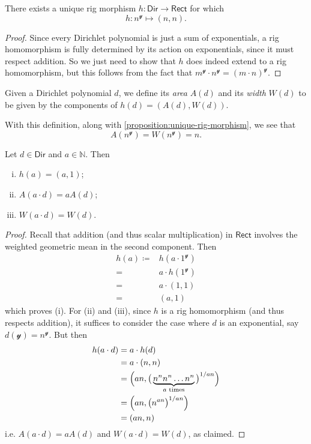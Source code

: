 \documentclass[11pt,fleqn]{article}
\newcommand{\yon}{\mathcal{y}}
\newcommand{\rig}[1]{\mathsf{#1}}
\newcommand{\Dir}{\rig{Dir}}
\newcommand{\Rect}{\rig{Rect}}
\begin{document}
\begin{proposition}
\label{proposition:unique-rig-morphism}
  There exists a unique rig morphism $h\colon\Dir\to\Rect$ for which
  \[
    h\colon n^\yon \mapsto (n,n).
  \]
\end{proposition}

\begin{proof}
  Since every Dirichlet polynomial is just a sum of exponentials, a rig homomorphism is fully determined by its action on exponentials, since it must respect addition.
  So we just need to show that $h$ does indeed extend to a rig homomorphism, but this follows from the fact that $m^\yon\cdot n^\yon=(m\cdot n)^\yon$.
\end{proof}

\begin{definition}
  Given a Dirichlet polynomial $d$, we define its \emph{area} $A(d)$ and its \emph{width} $W(d)$ to be given by the components of $h(d)=(A(d),W(d))$.
\end{definition}

With this definition, along with \cref{proposition:unique-rig-morphism}, we see that
\[
  A(n^\yon) = W(n^\yon) = n.
\]

\begin{lemma}
\label{lemma:h-and-scalar-multiples}
  Let $d\in\Dir$ and $a\in\mathbb{N}$.
  Then
  \begin{enumerate}[i.]
    \item $h(a)=(a,1)$;
    \item $A(a\cdot d)=aA(d)$;
    \item $W(a\cdot d)=W(d)$.
  \end{enumerate}
\end{lemma}

\begin{proof}
  Recall that addition (and thus scalar multiplication) in $\Rect$ involves the weighted geometric mean in the second component.
  Then
  \[
    \begin{aligned}
      h(a)
      \coloneqq& h(a\cdot1^\yon)
    \\=& a\cdot h(1^\yon)
    \\=& a\cdot(1,1)
    \\=& (a,1)
    \end{aligned}
  \]
  which proves (i).
  For (ii) and (iii), since $h$ is a rig homomorphism (and thus respects addition), it suffices to consider the case where $d$ is an exponential, say $d(\yon)=n^\yon$.
  But then
  \[
    \begin{aligned}
      h(a\cdot d)
      &= a\cdot h(d)
    \\&= a\cdot(n,n)
    \\&= \Big(
        an,
        \big(\underbrace{n^n n^n\ldots n^n}_{\mbox{\scriptsize$a$ times}}\big)^{1/an}
      \Big)
    \\&= \Big(
        an,
        \big(n^{an}\big)^{1/an}
      \Big)
    \\&= (an,n)
    \end{aligned}
  \]
  i.e. $A(a\cdot d)=aA(d)$ and $W(a\cdot d)=W(d)$, as claimed.
\end{proof}
\end{document}
